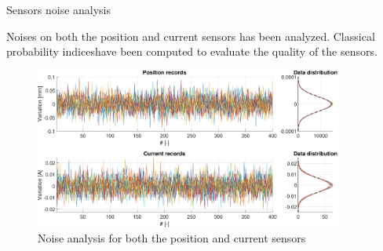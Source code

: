 \begin{frame}{Sensors noise analysis}

    Noises on both the position and current sensors has been analyzed.
    Classical probability indices\footnotemark[1] have been computed to evaluate the quality of the sensors.

    \begin{figure}[H]
        \centering
        \includegraphics[width=0.9\textwidth]{img/MATLAB/identification/sensor_noises.pdf}
        \caption{Noise analysis for both the position and current sensors}
    \end{figure}


\end{frame}



